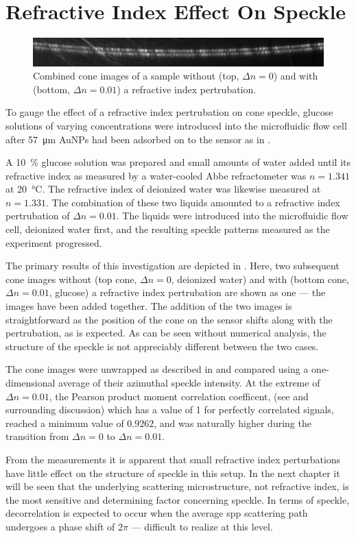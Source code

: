 \section{Refractive Index Effect On Speckle}
\begin{figure}[ht]
  \centering
  \includegraphics[keepaspectratio,width=15cm]{bulkri/figures/combineri.png}
  \caption{Combined cone images of a sample without (top, $\Delta n = 0$) and
    with (bottom, $\Delta n = 0.01$) a refractive index pertrubation. }
  \label{fig:speckleridrangos}
\end{figure}

To gauge the effect of a refractive index pertrubation on cone speckle,
glucose solutions of varying concentrations were introduced into the
microfluidic flow cell after \SI{57}{\micro\meter} AuNPs had been adsorbed on
to the sensor as in .

A \SI{10}{\percent} glucose solution was prepared and small amounts of water
added until its refractive index as measured by a water-cooled Abbe
refractometer was $n=1.341$ at \SI{20}{\celsius}.  The refractive index of
deionized water was likewise measured at $n=1.331$.  The combination of these
two liquids amounted to a refractive index pertrubation of $\Delta n = 0.01$.
The liquids were introduced into the microfluidic flow cell, deionized water
first, and the resulting speckle patterns measured as the experiment
progressed.

The primary results of this investigation are depicted in
.  Here, two subsequent cone images without (top
cone, $\Delta n = 0$, deionized water) and with (bottom cone, $\Delta n =
  0.01$, glucose) a refractive index pertrubation are shown as one --- the
images have been added together.  The addition of the two images is
straightforward as the position of the cone on the sensor shifts along with
the pertrubation, as is expected.  As can be seen without numerical analysis,
the structure of the speckle is not appreciably different between the two
cases.

The cone images were unwrapped as described in  and
compared using a one-dimensional average of their azimuthal speckle intensity.
At the extreme of $\Delta n = 0.01$, the Pearson product moment correlation
coefficent, (see  and surrounding
discussion) which has a value of 1 for perfectly correlated signals, reached a
minimum value of $0.9262$, and was naturally higher during the transition from
$\Delta n = 0$ to $\Delta n = 0.01$.

From the measurements it is apparent that small refractive index perturbations
have little effect on the structure of speckle in this setup.  In the next
chapter it will be seen that the underlying scattering microstructure, not
refractive index, is the most sensitive and determining factor concerning
speckle.  In terms of speckle, decorrelation is expected to occur when the
average \gls{spp} scattering path undergoes a phase shift of $2\pi$ --- difficult to
realize at this level.

